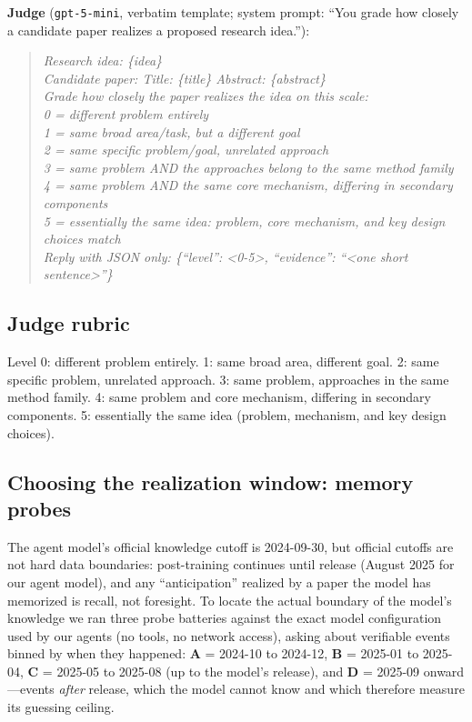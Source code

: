 \documentclass{article} %
\begin{document}
\textbf{Judge} (\texttt{gpt-5-mini}, verbatim template; system prompt:
``You grade how closely a candidate paper realizes a proposed research
idea.''):
\begin{quote}\small\itshape
Research idea: \{idea\} \\ Candidate paper: Title: \{title\}
Abstract: \{abstract\} \\ Grade how closely the paper realizes the
idea on this scale: \\ 0 = different problem entirely \\ 1 = same
broad area/task, but a different goal \\ 2 = same specific
problem/goal, unrelated approach \\ 3 = same problem AND the
approaches belong to the same method family \\ 4 = same problem AND
the same core mechanism, differing in secondary components \\ 5 =
essentially the same idea: problem, core mechanism, and key design
choices match \\ Reply with JSON only: \{``level'': <0-5>,
``evidence'': ``<one short sentence>''\}
\end{quote}

\subsection{Judge rubric}
\label{app:rubric}
Level 0: different problem entirely. 1: same broad area, different
goal. 2: same specific problem, unrelated approach. 3: same problem,
approaches in the same method family. 4: same problem and core
mechanism, differing in secondary components. 5: essentially the same
idea (problem, mechanism, and key design choices).

\subsection{Choosing the realization window: memory probes}
\label{app:probes}

The agent model's official knowledge cutoff is 2024-09-30, but official
cutoffs are not hard data boundaries: post-training continues until
release (August 2025 for our agent model), and any ``anticipation''
realized by a paper the model has memorized is recall, not foresight.
To locate the actual boundary of the model's knowledge we ran three
probe batteries against the exact model configuration used by our
agents (no tools, no network access), asking about verifiable events
binned by when they happened: \textbf{A} = 2024-10 to 2024-12,
\textbf{B} = 2025-01 to 2025-04, \textbf{C} = 2025-05 to 2025-08 (up
to the model's release), and \textbf{D} = 2025-09 onward---events
\emph{after} release, which the model cannot know and which therefore
measure its guessing ceiling.
\end{document}
